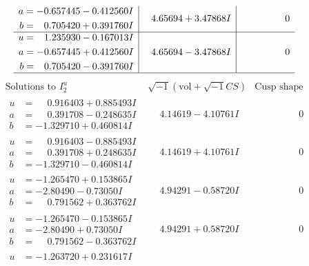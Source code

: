 \documentclass[1p]{elsarticle_modified}
\theoremstyle{definition}
\newcommand{\I}{\sqrt{-1}}
\begin{document}
$$\begin{array}{c|c|c}
\begin{aligned}
a &= -0.657445 - 0.412560 I \\
b &= \phantom{-}0.705420 + 0.391760 I\end{aligned}
 & \phantom{-}4.65694 + 3.47868 I & \phantom{-0.000000 } 0 \\ \hline\begin{aligned}
u &= \phantom{-}1.235930 - 0.167013 I \\
a &= -0.657445 + 0.412560 I \\
b &= \phantom{-}0.705420 - 0.391760 I\end{aligned}
 & \phantom{-}4.65694 - 3.47868 I & \phantom{-0.000000 } 0\\
 \hline 
 \end{array}$$\newpage$$\begin{array}{c|c|c}  
\text{Solutions to }I^u_{2}& \I (\text{vol} + \sqrt{-1}CS) & \text{Cusp shape}\\
 \hline 
\begin{aligned}
u &= \phantom{-}0.916403 + 0.885493 I \\
a &= \phantom{-}0.391708 - 0.248635 I \\
b &= -1.329710 + 0.460814 I\end{aligned}
 & \phantom{-}4.14619 - 4.10761 I & \phantom{-0.000000 } 0 \\ \hline\begin{aligned}
u &= \phantom{-}0.916403 - 0.885493 I \\
a &= \phantom{-}0.391708 + 0.248635 I \\
b &= -1.329710 - 0.460814 I\end{aligned}
 & \phantom{-}4.14619 + 4.10761 I & \phantom{-0.000000 } 0 \\ \hline\begin{aligned}
u &= -1.265470 + 0.153865 I \\
a &= -2.80490 - 0.73050 I \\
b &= \phantom{-}0.791562 + 0.363762 I\end{aligned}
 & \phantom{-}4.94291 - 0.58720 I & \phantom{-0.000000 } 0 \\ \hline\begin{aligned}
u &= -1.265470 - 0.153865 I \\
a &= -2.80490 + 0.73050 I \\
b &= \phantom{-}0.791562 - 0.363762 I\end{aligned}
 & \phantom{-}4.94291 + 0.58720 I & \phantom{-0.000000 } 0 \\ \hline\begin{aligned}
u &= -1.263720 + 0.231617 I \\

\end{aligned}
\end{array}$$
\end{document}
